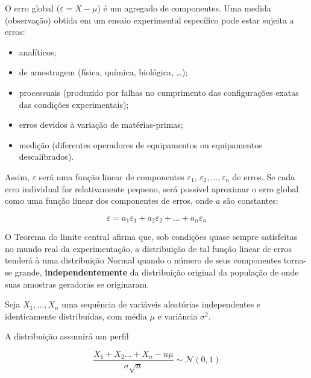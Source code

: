 \documentclass[
]{book}
\providecommand{\tightlist}{%
  \setlength{\itemsep}{0pt}\setlength{\parskip}{0pt}}
\begin{document}
O erro global (\(\varepsilon= X -\mu\)) é um agregado de componentes. Uma medida (observação) obtida em um ensaio experimental específico pode estar sujeita a erros:

\hfill\break

\begin{itemize}
\tightlist
\item
  analíticos;
\item
  de amostragem (física, química, biológica, \ldots);\\
\item
  processuais (produzido por falhas no cumprimento das configurações exatas das condições experimentais);
\item
  erros devidos à variação de matérias-primas;
\item
  medição (diferentes operadores de equipamentos ou equipamentos descalibrados).
\end{itemize}

\hfill\break

Assim, \(\varepsilon\) será uma função linear de componentes \(\varepsilon_{1}\), \(\varepsilon_{2}, ...,\varepsilon_{n}\) de erros. Se cada erro individual for relativamente pequeno, será possível aproximar o erro global como uma função linear dos componentes de erros, onde \(a\) são constantes:

\hfill\break

\[
\varepsilon = a_{1}\varepsilon_{1} +  a_{2}\varepsilon_{2} + ... +  a_{n}\varepsilon_{n}
\]

\hfill\break

O Teorema do limite central afirma que, sob condições quase sempre satisfeitas no mundo real da experimentação, a distribuição de tal função linear de erros tenderá à uma distribuição Normal quando o número de seus componentes torna-se grande, \textbf{independentemente} da distribuição original da população de onde suas amostras geradoras se originaram.

\hfill\break

Seja \(X_{1},\dots,X_{n}\) uma sequência de variáveis aleatórias independentes e identicamente distribuídas, com média \(\mu\) e variância \(\sigma^{2}\).

\hfill\break

A distribuição assumirá um perfil

\hfill\break

\[
\frac{X_{1} + X_{2} \dots + X_{n} - n \mu}{\sigma \sqrt{n}} \sim  \mathcal{N}(0,1)
\]

\hfill\break
\end{document}
